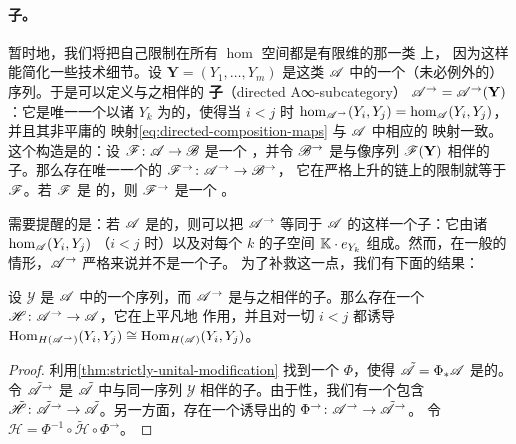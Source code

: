 \paragraph{\trDirected{}子\trCategory。}\label{sub:directed-subcategories}
暂时地，我们将把自己限制在所有 $\hom$ 空间都是有限维的那一类 \trACategory{}上，
因为这样能简化一些技术细节。设 $\mathbf{Y}=(Y_1,\ldots,Y_m)$ 是这类\trCategory{}%
$\mathscr{A}$ 中\trObject{}的一个（未必例外的）序列。于是可以定义与之相伴的%
\textbf{\trDirected{}子\trCategory}（directed A∞-subcategory）
$\mathscr{A}^{\rightarrow}=\mathscr{A}^{\rightarrow}(\mathbf{Y})$：它是唯一一个以诸
$Y_k$ 为\trObject{}的\trDirected\trACategory，使得当 $i<j$ 时
$\hom_{\mathscr{A}^{\rightarrow}}(Y_i,Y_j)=\hom_{\mathscr{A}}(Y_i,Y_j)$，并且其非平庸的%
\trComposition{}映射\eqref{eq:directed-composition-maps} 与 $\mathscr{A}$ 中相应的
映射一致。这个构造是\trFunctoriality{}的：设 $\mathscr{F}\colon\mathscr{A}\to\mathscr{B}$
是一个 \trAFunctor，并令 $\mathscr{B}^{\rightarrow}$ 是与像序列 $\mathscr{F}(\mathbf{Y})$
相伴的\trDirected{}子\trCategory。那么存在唯一一个\trStrictlyUnital{}的%
\trAFunctor{} $\mathscr{F}^{\rightarrow}\colon\mathscr{A}^{\rightarrow}\to\mathscr{B}^{\rightarrow}$，
它在严格上升的\trObject{}链上的限制就等于 $\mathscr{F}$。若 $\mathscr{F}$ 是%
\trCohomology\trFullyFaithful{}的，则 $\mathscr{F}^{\rightarrow}$ 是一个%
\trQuasiisomorphism。

需要提醒的是：若 $\mathscr{A}$ 是\trStrictlyUnital{}的，则可以把 $\mathscr{A}^{\rightarrow}$
等同于 $\mathscr{A}$ 的这样一个子\trCategory：它由诸 $\hom_{\mathscr{A}}(Y_i,Y_j)$
（$i<j$ 时）以及对每个 $k$ 的子空间 $\mathbb{K}\cdot e_{Y_k}$ 组成。然而，在一般的%
\trCunital{}情形，$\mathscr{A}^{\rightarrow}$ 严格来说并不是一个子\trCategory。
为了补救这一点，我们有下面的结果：

\begin{lemma}\label{thm:directed-subcategory-inclusion}
设 $\mathscr{Y}$ 是 $\mathscr{A}$ 中\trObject{}的一个序列，而 $\mathscr{A}^{\rightarrow}$
是与之相伴的\trDirected{}子\trCategory。那么存在一个 \trAFunctor{}%
$\mathscr{H}\colon\mathscr{A}^{\rightarrow}\to\mathscr{A}$，它在\trObject{}上平凡地
作用，并且对一切 $i<j$ 都诱导\trIsomorphism{}%
$\operatorname{Hom}_{H(\mathscr{A}^{\rightarrow})}(Y_i,Y_j)\cong\operatorname{Hom}_{H(\mathscr{A})}(Y_i,Y_j)$。
\end{lemma}

\begin{proof}
利用\cref{thm:strictly-unital-modification} 找到一个\trFormalDiffeomorphism{}%
$\Phi$，使得 $\tilde{\mathscr{A}}=\Phi_*\mathscr{A}$ 是\trStrictlyUnital{}的。令
$\tilde{\mathscr{A}}^{\rightarrow}$ 是 $\tilde{\mathscr{A}}$ 中与同一序列 $\mathscr{Y}$
相伴的\trDirected{}子\trCategory。由于\trStrictlyUnital{}性，我们有一个包含%
\trFunctor{} $\tilde{\mathscr{H}}\colon\tilde{\mathscr{A}}^{\rightarrow}
\to\tilde{\mathscr{A}}$。另一方面，存在一个诱导出的\trFormalDiffeomorphism{}%
$\Phi^{\rightarrow}\colon\mathscr{A}^{\rightarrow}\to\tilde{\mathscr{A}}^{\rightarrow}$。
令 $\mathscr{H}=\Phi^{-1}\circ\tilde{\mathscr{H}}\circ\Phi^{\rightarrow}$。
\end{proof}

